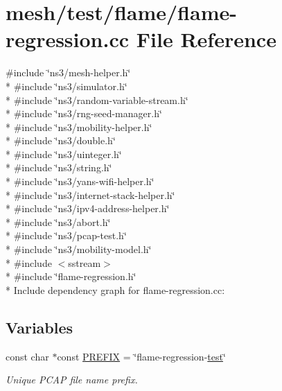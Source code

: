 \hypertarget{flame-regression_8cc}{}\section{mesh/test/flame/flame-\/regression.cc File Reference}
\label{flame-regression_8cc}
{\ttfamily \#include \char`\"{}ns3/mesh-\/helper.\+h\char`\"{}}\\*
{\ttfamily \#include \char`\"{}ns3/simulator.\+h\char`\"{}}\\*
{\ttfamily \#include \char`\"{}ns3/random-\/variable-\/stream.\+h\char`\"{}}\\*
{\ttfamily \#include \char`\"{}ns3/rng-\/seed-\/manager.\+h\char`\"{}}\\*
{\ttfamily \#include \char`\"{}ns3/mobility-\/helper.\+h\char`\"{}}\\*
{\ttfamily \#include \char`\"{}ns3/double.\+h\char`\"{}}\\*
{\ttfamily \#include \char`\"{}ns3/uinteger.\+h\char`\"{}}\\*
{\ttfamily \#include \char`\"{}ns3/string.\+h\char`\"{}}\\*
{\ttfamily \#include \char`\"{}ns3/yans-\/wifi-\/helper.\+h\char`\"{}}\\*
{\ttfamily \#include \char`\"{}ns3/internet-\/stack-\/helper.\+h\char`\"{}}\\*
{\ttfamily \#include \char`\"{}ns3/ipv4-\/address-\/helper.\+h\char`\"{}}\\*
{\ttfamily \#include \char`\"{}ns3/abort.\+h\char`\"{}}\\*
{\ttfamily \#include \char`\"{}ns3/pcap-\/test.\+h\char`\"{}}\\*
{\ttfamily \#include \char`\"{}ns3/mobility-\/model.\+h\char`\"{}}\\*
{\ttfamily \#include $<$sstream$>$}\\*
{\ttfamily \#include \char`\"{}flame-\/regression.\+h\char`\"{}}\\*
Include dependency graph for flame-\/regression.cc\+:
\subsection*{Variables}
\begin{DoxyCompactItemize}
\item 
const char $\ast$const \hyperlink{flame-regression_8cc_a61dc66981fa47bfd0066a57a487c599c}{P\+R\+E\+F\+IX} = \char`\"{}flame-\/regression-\/\hyperlink{main-test-sync_8cc_a708a4c1a4d0c4acc4c447310dd4db27f}{test}\char`\"{}
\begin{DoxyCompactList}\small\item\em Unique P\+C\+AP file name prefix. \end{DoxyCompactList}\end{DoxyCompactItemize}


